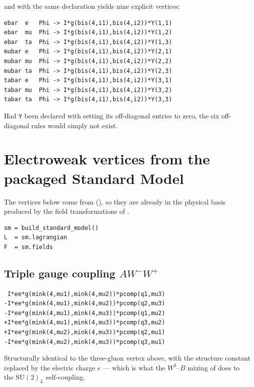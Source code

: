 \noindent and with  the same declaration yields nine
explicit vertices:

\begin{verbatim}
ebar  e   Phi -> I*g(bis(4,i1),bis(4,i2))*Y(1,1)
ebar  mu  Phi -> I*g(bis(4,i1),bis(4,i2))*Y(1,2)
ebar  ta  Phi -> I*g(bis(4,i1),bis(4,i2))*Y(1,3)
mubar e   Phi -> I*g(bis(4,i1),bis(4,i2))*Y(2,1)
mubar mu  Phi -> I*g(bis(4,i1),bis(4,i2))*Y(2,2)
mubar ta  Phi -> I*g(bis(4,i1),bis(4,i2))*Y(2,3)
tabar e   Phi -> I*g(bis(4,i1),bis(4,i2))*Y(3,1)
tabar mu  Phi -> I*g(bis(4,i1),bis(4,i2))*Y(3,2)
tabar ta  Phi -> I*g(bis(4,i1),bis(4,i2))*Y(3,3)
\end{verbatim}

\noindent Had \texttt{Y} been declared with  setting its
off-diagonal entries to zero, the six off-diagonal rules would simply not
exist.

\section{Electroweak vertices from the packaged Standard Model}

The vertices below come from 
(), so they are already in the physical basis
produced by the field transformations of
.

\begin{verbatim}
sm = build_standard_model()
L  = sm.lagrangian
F  = sm.fields
\end{verbatim}

\subsection*{Triple gauge coupling $A W^- W^+$}

\begin{verbatim}
 I*ee*g(mink(4,mu1),mink(4,mu2))*pcomp(q1,mu3)
-I*ee*g(mink(4,mu1),mink(4,mu2))*pcomp(q2,mu3)
-I*ee*g(mink(4,mu1),mink(4,mu3))*pcomp(q1,mu2)
+I*ee*g(mink(4,mu1),mink(4,mu3))*pcomp(q3,mu2)
+I*ee*g(mink(4,mu2),mink(4,mu3))*pcomp(q2,mu1)
-I*ee*g(mink(4,mu2),mink(4,mu3))*pcomp(q3,mu1)
\end{verbatim}

\noindent Structurally identical to the three-gluon vertex above, with the
structure constant replaced by the electric charge $e$ --- which is what the
$W^3$--$B$ mixing of  does to the
$\mathrm{SU}(2)_L$ self-coupling.

